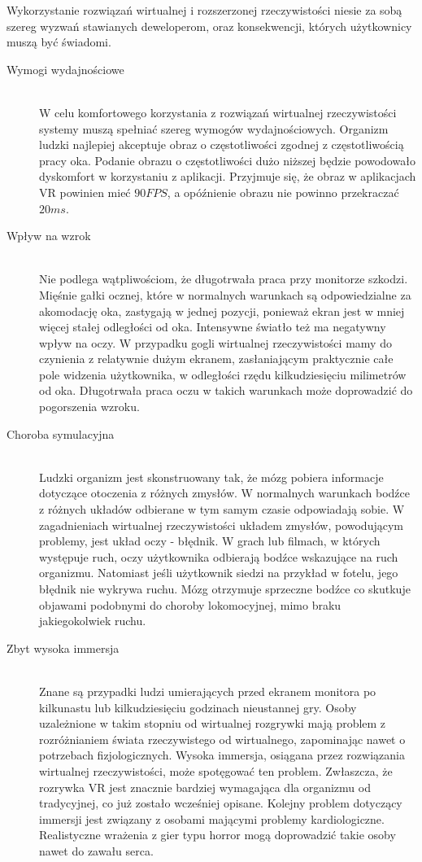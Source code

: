 \documentclass[a4paper,11pt,twoside]{report}
\theoremstyle{definition}
\begin{document}
Wykorzystanie rozwiązań wirtualnej i rozszerzonej rzeczywistości niesie za sobą szereg wyzwań stawianych deweloperom, oraz konsekwencji, których użytkownicy muszą być świadomi.

\begin{description}
\item [Wymogi wydajnościowe] \hfill \\
W celu komfortowego korzystania z rozwiązań wirtualnej rzeczywistości systemy muszą spełniać szereg wymogów wydajnościowych. Organizm ludzki najlepiej akceptuje obraz o częstotliwości zgodnej z częstotliwością pracy oka. Podanie obrazu o częstotliwości dużo niższej będzie powodowało dyskomfort w korzystaniu z aplikacji. Przyjmuje się, że obraz w aplikacjach VR powinien mieć $90 FPS$, a opóźnienie obrazu nie powinno przekraczać $20 ms$\cite{VRlatency}.
\item [Wpływ na wzrok] \hfill \\
Nie podlega wątpliwościom, że długotrwała praca przy monitorze szkodzi. Mięśnie gałki ocznej, które w normalnych warunkach są odpowiedzialne za akomodację oka, zastygają w jednej pozycji, ponieważ ekran jest w mniej więcej stałej odległości od oka. Intensywne światło też ma negatywny wpływ na oczy. W przypadku gogli wirtualnej rzeczywistości mamy do czynienia z relatywnie dużym ekranem, zasłaniającym praktycznie całe pole widzenia użytkownika, w odległości rzędu kilkudziesięciu milimetrów od oka. Długotrwała praca oczu w takich warunkach może doprowadzić do pogorszenia wzroku.
\item [Choroba symulacyjna] \hfill \\
Ludzki organizm jest skonstruowany tak, że mózg pobiera informacje dotyczące otoczenia z różnych zmysłów. W normalnych warunkach bodźce z różnych układów odbierane w tym samym czasie odpowiadają sobie. W zagadnieniach wirtualnej rzeczywistości układem zmysłów, powodującym problemy, jest układ oczy - błędnik. W grach lub filmach, w których występuje ruch, oczy użytkownika odbierają bodźce wskazujące na ruch organizmu. Natomiast jeśli użytkownik siedzi na przykład w fotelu, jego błędnik nie wykrywa ruchu. Mózg otrzymuje sprzeczne bodźce co skutkuje objawami podobnymi do choroby lokomocyjnej, mimo braku jakiegokolwiek ruchu.\cite{VRsickness}
\item [Zbyt wysoka immersja] \hfill \\
Znane są przypadki ludzi umierających przed ekranem monitora po kilkunastu lub kilkudziesięciu godzinach nieustannej gry. Osoby uzależnione w takim stopniu od wirtualnej rozgrywki mają problem z rozróżnianiem świata rzeczywistego od wirtualnego, zapominając nawet o potrzebach fizjologicznych. Wysoka immersja, osiągana przez rozwiązania wirtualnej rzeczywistości, może spotęgować ten problem. Zwłaszcza, że rozrywka VR jest znacznie bardziej wymagająca dla organizmu od tradycyjnej, co już zostało wcześniej opisane. 
Kolejny problem dotyczący immersji jest związany z osobami mającymi problemy kardiologiczne. Realistyczne wrażenia z gier typu horror mogą doprowadzić takie osoby nawet do zawału serca.
\end{description}
\end{document}
